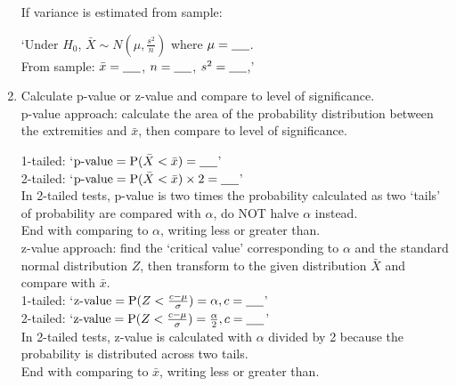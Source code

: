 \documentclass[../main]{subfiles}
\begin{document}
\begin{enumerate}
			If variance is estimated from sample: 

			`Under \(H_0\), \(\bar{X} \sim N \left( \mu, \frac{s^2}{n} \right) \) where \(\mu = \text{\underline{\hspace{0.5cm}}}\). \\ From sample: \(\bar{x} = \text{\underline{\hspace{0.5cm}}}\), \(n = \text{\underline{\hspace{0.5cm}}}\), \(s^2 = \text{\underline{\hspace{0.5cm}}}\),'\\

		\item Calculate p-value or z-value and compare to level of significance. \\

			p-value approach: calculate the area of the probability distribution between the extremities and \(\bar{x}\), then compare to level of significance.

			1-tailed: `\(\text{p-value} = \operatorname{P}(\bar{X} < \bar{x}) = \text{\underline{\hspace{0.5cm}}}\)'\\
			2-tailed: `\(\text{p-value} = \operatorname{P}(\bar{X} < \bar{x}) \times 2 = \text{\underline{\hspace{0.5cm}}}\)' \\
			In 2-tailed tests, p-value is two times the probability calculated as two `tails' of probability are compared with \(\alpha\), do NOT halve \(\alpha\) instead. \\
			End with comparing to \(\alpha\), writing less or greater than. \\

			z-value approach: find the `critical value' corresponding to \(\alpha\) and the standard normal distribution \(Z\), then transform to the given distribution \(\bar{X}\) and compare with \(\bar{x}\). \\
			1-tailed: `\(\text{z-value} = \operatorname{P}(Z < \frac{c - \mu}{\sigma}) = \alpha, c = \text{\underline{\hspace{0.5cm}}}\)'\\
			2-tailed: `\(\text{z-value} = \operatorname{P}(Z < \frac{c - \mu}{\sigma}) = \frac{\alpha}{2}, c = \text{\underline{\hspace{0.5cm}}}\)'\\
			In 2-tailed tests, z-value is calculated with \(\alpha\) divided by 2 because the probability is distributed across two tails. \\
			End with comparing to \(\bar{x}\), writing less or greater than. \\


\end{enumerate}
\end{document}
